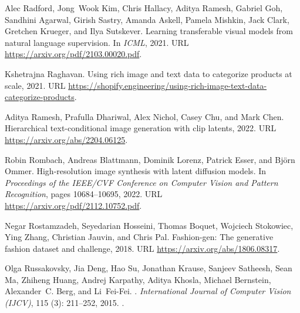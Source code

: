 \documentclass{bmvc2k}
\begin{document}
\begin{thebibliography}{63}
Alec Radford, Jong~Wook Kim, Chris Hallacy, Aditya Ramesh, Gabriel Goh,
  Sandhini Agarwal, Girish Sastry, Amanda Askell, Pamela Mishkin, Jack Clark,
  Gretchen Krueger, and Ilya Sutskever.
\newblock Learning transferable visual models from natural language
  supervision.
\newblock In \emph{ICML}, 2021.
\newblock URL \url{https://arxiv.org/pdf/2103.00020.pdf}.

Kshetrajna Raghavan.
\newblock Using rich image and text data to categorize products at scale, 2021.
\newblock URL
  \url{https://shopify.engineering/using-rich-image-text-data-categorize-products}.

Aditya Ramesh, Prafulla Dhariwal, Alex Nichol, Casey Chu, and Mark Chen.
\newblock Hierarchical text-conditional image generation with clip latents,
  2022.
\newblock URL \url{https://arxiv.org/abs/2204.06125}.

Robin Rombach, Andreas Blattmann, Dominik Lorenz, Patrick Esser, and Bj{\"o}rn
  Ommer.
\newblock High-resolution image synthesis with latent diffusion models.
\newblock In \emph{Proceedings of the IEEE/CVF Conference on Computer Vision
  and Pattern Recognition}, pages 10684--10695, 2022.
\newblock URL \url{https://arxiv.org/pdf/2112.10752.pdf}.

Negar Rostamzadeh, Seyedarian Hosseini, Thomas Boquet, Wojciech Stokowiec, Ying
  Zhang, Christian Jauvin, and Chris Pal.
\newblock Fashion-gen: The generative fashion dataset and challenge, 2018.
\newblock URL \url{https://arxiv.org/abs/1806.08317}.

Olga Russakovsky, Jia Deng, Hao Su, Jonathan Krause, Sanjeev Satheesh, Sean Ma,
  Zhiheng Huang, Andrej Karpathy, Aditya Khosla, Michael Bernstein,
  Alexander~C. Berg, and Li~Fei-Fei.
.
\newblock \emph{International Journal of Computer Vision (IJCV)}, 115
  (3): 211--252, 2015.
\newblock {}.


\end{thebibliography}
\end{document}
